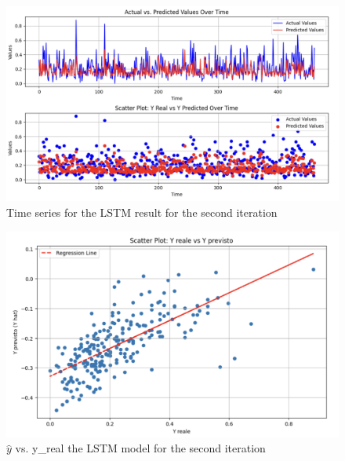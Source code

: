 \documentclass[10pt]{article} %
\begin{document}
    \begin{figure}
        \centering
        \includegraphics[scale=0.4]{Assets/iteration 2/lstm_it2_1.png}
        \caption{Time series for the LSTM result for the second iteration}
        \label{fig:enter-label}
    \end{figure}

    \begin{figure}
        \centering
        \includegraphics[scale=0.4]{Assets/iteration 2/lstm_it2_2.png}
        \caption{$\hat{y}$ vs. y\_real the LSTM model for the second iteration}
        \label{fig:enter-label}
    \end{figure}

    \newpage

 
\end{document}

